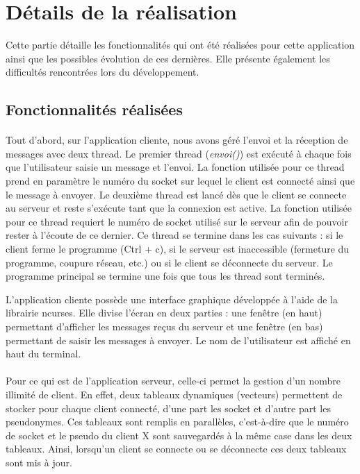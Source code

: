 \section{Détails de la réalisation}
\label{sec:detail-realisation}
    
    Cette partie détaille les fonctionnalités qui ont été réalisées pour cette application ainsi que les possibles évolution de ces dernières. Elle présente également les difficultés rencontrées lors du développement.

    \subsection{Fonctionnalités réalisées}
        \paragraph{}
        Tout d'abord, sur l'application cliente, nous avons géré l'envoi et la réception de messages avec deux thread. Le premier thread (\textit{envoi()}) est exécuté à chaque fois que l'utilisateur saisie un message et l'envoi. La fonction utilisée pour ce thread prend en paramètre le numéro du socket sur lequel le client est connecté ainsi que le message à envoyer. Le deuxième thread est lancé dès que le client se connecte au serveur et reste s'exécute tant que la connexion est active. La fonction utilisée pour ce thread requiert le numéro de socket utilisé sur le serveur afin de pouvoir rester à l'écoute de ce dernier. Ce thread se termine dans les cas suivants : si le client ferme le programme (Ctrl + c), si le serveur est inaccessible (fermeture du programme, coupure réseau, etc.) ou si le client se déconnecte du serveur. Le programme principal se termine une fois que tous les thread sont terminés.
        
        L'application cliente possède une interface graphique développée à l'aide de la librairie ncurses. Elle divise l'écran en deux parties : une fenêtre (en haut) permettant d'afficher les messages reçus du serveur et une fenêtre (en bas) permettant de saisir les messages à envoyer. Le nom de l'utilisateur est affiché en haut du terminal.
        
        \paragraph{}
        Pour ce qui est de l'application serveur, celle-ci permet la gestion d'un nombre illimité de client. En effet, deux tableaux dynamiques (vecteurs) permettent de stocker pour chaque client connecté, d'une part les socket et d'autre part les pseudonymes. Ces tableaux sont remplis en parallèles, c'est-à-dire que le numéro de socket et le pseudo du client X sont sauvegardés à la même case dans les deux tableaux. Ainsi, lorsqu'un client se connecte ou se déconnecte ces deux tableaux sont mis à jour.
        
